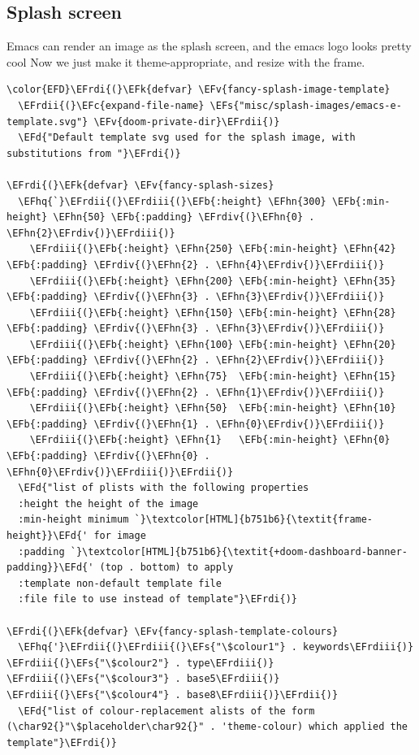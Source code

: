 \documentclass{scrartcl}
\newcommand{\EFk}[1]{\textcolor{EFk}{#1}} %
\newcommand{\EFd}[1]{\textcolor{EFd}{\textit{#1}}} %
\newcommand{\EFs}[1]{\textcolor{EFs}{#1}} %
\newcommand{\EFb}[1]{\textcolor{EFb}{#1}} %
\newcommand{\EFc}[1]{\textcolor{EFc}{#1}} %
\newcommand{\EFv}[1]{\textcolor{EFv}{#1}} %
\newcommand{\EFhn}[1]{\textcolor{EFhn}{\textbf{#1}}} %
\newcommand{\EFhq}[1]{\textcolor{EFhq}{#1}} %
\newcommand{\EFrdi}[1]{\textcolor{EFrdi}{#1}} %
\newcommand{\EFrdii}[1]{\textcolor{EFrdii}{#1}} %
\newcommand{\EFrdiii}[1]{\textcolor{EFrdiii}{#1}} %
\newcommand{\EFrdiv}[1]{\textcolor{EFrdiv}{#1}} %
\begin{document}
\subsection{Splash screen}
\label{sec:org7b52e09}
Emacs can render an image as the splash screen, and the emacs logo looks pretty cool
Now we just make it theme-appropriate, and resize with the frame.
\begin{Code}
\begin{Verbatim}[]
\color{EFD}\EFrdi{(}\EFk{defvar} \EFv{fancy-splash-image-template}
  \EFrdii{(}\EFc{expand-file-name} \EFs{"misc/splash-images/emacs-e-template.svg"} \EFv{doom-private-dir}\EFrdii{)}
  \EFd{"Default template svg used for the splash image, with substitutions from "}\EFrdi{)}

\EFrdi{(}\EFk{defvar} \EFv{fancy-splash-sizes}
  \EFhq{`}\EFrdii{(}\EFrdiii{(}\EFb{:height} \EFhn{300} \EFb{:min-height} \EFhn{50} \EFb{:padding} \EFrdiv{(}\EFhn{0} . \EFhn{2}\EFrdiv{)}\EFrdiii{)}
    \EFrdiii{(}\EFb{:height} \EFhn{250} \EFb{:min-height} \EFhn{42} \EFb{:padding} \EFrdiv{(}\EFhn{2} . \EFhn{4}\EFrdiv{)}\EFrdiii{)}
    \EFrdiii{(}\EFb{:height} \EFhn{200} \EFb{:min-height} \EFhn{35} \EFb{:padding} \EFrdiv{(}\EFhn{3} . \EFhn{3}\EFrdiv{)}\EFrdiii{)}
    \EFrdiii{(}\EFb{:height} \EFhn{150} \EFb{:min-height} \EFhn{28} \EFb{:padding} \EFrdiv{(}\EFhn{3} . \EFhn{3}\EFrdiv{)}\EFrdiii{)}
    \EFrdiii{(}\EFb{:height} \EFhn{100} \EFb{:min-height} \EFhn{20} \EFb{:padding} \EFrdiv{(}\EFhn{2} . \EFhn{2}\EFrdiv{)}\EFrdiii{)}
    \EFrdiii{(}\EFb{:height} \EFhn{75}  \EFb{:min-height} \EFhn{15} \EFb{:padding} \EFrdiv{(}\EFhn{2} . \EFhn{1}\EFrdiv{)}\EFrdiii{)}
    \EFrdiii{(}\EFb{:height} \EFhn{50}  \EFb{:min-height} \EFhn{10} \EFb{:padding} \EFrdiv{(}\EFhn{1} . \EFhn{0}\EFrdiv{)}\EFrdiii{)}
    \EFrdiii{(}\EFb{:height} \EFhn{1}   \EFb{:min-height} \EFhn{0}  \EFb{:padding} \EFrdiv{(}\EFhn{0} . \EFhn{0}\EFrdiv{)}\EFrdiii{)}\EFrdii{)}
  \EFd{"list of plists with the following properties
  :height the height of the image
  :min-height minimum `}\textcolor[HTML]{b751b6}{\textit{frame-height}}\EFd{' for image
  :padding `}\textcolor[HTML]{b751b6}{\textit{+doom-dashboard-banner-padding}}\EFd{' (top . bottom) to apply
  :template non-default template file
  :file file to use instead of template"}\EFrdi{)}

\EFrdi{(}\EFk{defvar} \EFv{fancy-splash-template-colours}
  \EFhq{'}\EFrdii{(}\EFrdiii{(}\EFs{"\$colour1"} . keywords\EFrdiii{)} \EFrdiii{(}\EFs{"\$colour2"} . type\EFrdiii{)} \EFrdiii{(}\EFs{"\$colour3"} . base5\EFrdiii{)} \EFrdiii{(}\EFs{"\$colour4"} . base8\EFrdiii{)}\EFrdii{)}
  \EFd{"list of colour-replacement alists of the form (\char92{}"\$placeholder\char92{}" . 'theme-colour) which applied the template"}\EFrdi{)}


\end{Verbatim}
\end{Code}
\end{document}
